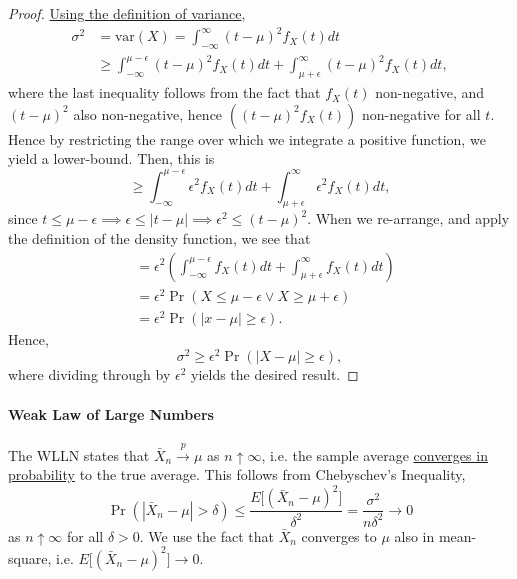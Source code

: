 \documentclass[12pt]{article}\usepackage[]{graphicx}\usepackage[]{color}
\begin{document}
\begin{proof}   
\ul{Using the definition of variance},
\begin{align*}     
  \sigma^2 &= \textrm{var}(X) = \int_{-\infty}^\infty (t - \mu)^2 f_X(t) dt \\
           &\geq \int_{-\infty}^{\mu - \epsilon} (t - \mu)^2 f_X(t) dt + \int_{\mu + \epsilon}^\infty (t- \mu)^2 f_X(t) dt,   
\end{align*}
  where the last inequality follows from the fact that $f_X(t)$ non-negative, and $(t-\mu)^2$ also non-negative, hence $\left((t-\mu)^2f_X(t)\right)$
non-negative for all $t$. Hence by restricting the range over which we integrate a positive function, we yield a lower-bound. Then, this is
\[
\geq \int_{-\infty}^{\mu - \epsilon} \epsilon^2 f_X(t) dt + \int_{\mu + \epsilon}^\infty \epsilon^2 f_X(t) dt,
\]
since $t \leq \mu - \epsilon \implies \epsilon \leq |t-\mu| \implies \epsilon^2 \leq (t-\mu)^2$. When we re-arrange, and apply the definition of the density function, we see that
\begin{align*}   &= \epsilon^2 \left(\int_{-\infty}^{\mu - \epsilon} f_X(t) dt + \int_{\mu + \epsilon}^{\infty} f_X(t) dt \right) \\
  &= \epsilon^2 \Pr(X \leq \mu - \epsilon \lor X \geq \mu + \epsilon) \\
  &= \epsilon^2 \Pr \left( |x - \mu| \geq \epsilon \right).  \end{align*}
Hence,
\[
  \sigma^2 \geq \epsilon^2 \Pr(|X-\mu| \geq \epsilon),
\]
where dividing through by $\epsilon^2$ yields the desired result. 
\end{proof}

\paragraph{Weak Law of Large Numbers} The WLLN states that $\bar{X}_n \overset{p}{\longrightarrow} \mu$ as $n \uparrow \infty$, i.e. the sample average 
\ul{converges in probability} to the true average. This follows from Chebyschev's Inequality,
\[
\Pr(|\bar{X}_n - \mu| > \delta) \leq \frac{E \big[ (\bar{X}_n - \mu)^2 \big]}{\delta^2} = \frac{\sigma^2}{n\delta^2} \longrightarrow 0
\]
as $n \uparrow \infty$ for all $\delta > 0$. We use the fact that $\bar{X}_n$ converges to $\mu$ also in mean-square, i.e. $E\big[ (\bar{X}_n - \mu)^2 \big] \longrightarrow 0$.
\end{document}
